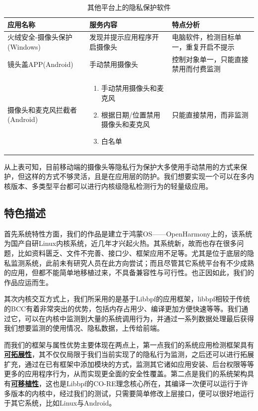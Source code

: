 \documentclass[12pt,a4paper]{ctexart}
\begin{document}
\vspace{0.3cm}
\begin{table}
\begin{tabular}{|p{3cm}|p{6cm}|p{3cm}|}
  \hline
  \rowcolor{blue!50} 应用名称&服务内容&特点分析\\
  \hline
  火绒安全-摄像头保护(Windows)&发现并提示应用程序开启摄像头&电脑软件，检测目标单一，重复开启不提示\\
  \hline
  镜头盖APP(Android)&手动禁用摄像头&控制对象单一，只能直接禁用而付费监测\\
  \hline
  摄像头和麦克风拦截者(Android)&\begin{enumerate}
                                  \item 手动禁用摄像头和麦克风
                                  \item 根据日期/位置禁用摄像头和麦克风
                                        \item 白名单
                                \end{enumerate}&只能直接禁用，而非监测\\
  \hline
\end{tabular}
\caption{其他平台上的隐私保护软件}
\end{table}

从上表可知，目前移动端的摄像头等隐私行为保护大多使用手动禁用的方式来保护，但这样的方式不够灵活，且是在应用层的防护。我们想要实现一个可以在多内核版本、多类型平台都可以进行内核级隐私检测行为的轻量级应用。

\subsection{特色描述}
首先系统特性方面，我们的作品是建立于鸿蒙OS——OpenHarmony上的，该系统为国产自研Linux内核系统，近几年才兴起火热。其系统新，故而也存在很多问题，比如资料匮乏、文件不完善、接口少、框架应用不足等。尤其是位于底层的隐私监测系统，此前未有研究人员在此方向尝试；而且尽管其它系统平台有不少成熟的应用，但都不能简单地移植过来，不具备兼容性与可行性。也正因如此，我们的作品应运而生。


其次内核交互方式上，我们所采用的是基于Libbpf的应用框架，libbpf相较于传统的BCC有着非常突出的优势，包括内存占用少、编译更加方便快速等等。我们通过它，可以在内核中监测到大量的系统调用行为，并通过一系列数据处理最后获得我们想要监测的使用情况、隐私数据，上传给前端。


而我们的框架与属性优势主要体现在两点上，第一点我们的系统应用检测框架具有\uline{\textbf{可拓展性}}，其不仅仅局限于我们当前实现了的隐私行为监测，之后还可以进行拓展扩充，通过在已有框架中添加模块的方式，监测其它诸如应用安装、后台权限等等更多的应用程序行为，从而实现更全面的安全性覆盖。第二点是我们的系统架构具有\uline{\textbf{可移植性}}，这也是Libbpf的CO-RE理念核心所在，其编译一次便可以运行于许多版本的内核中，经过我们的测试，只需要简单修改上层接口，便可以很好地运行于其它系统，比如Linux与Android。
\end{document}
